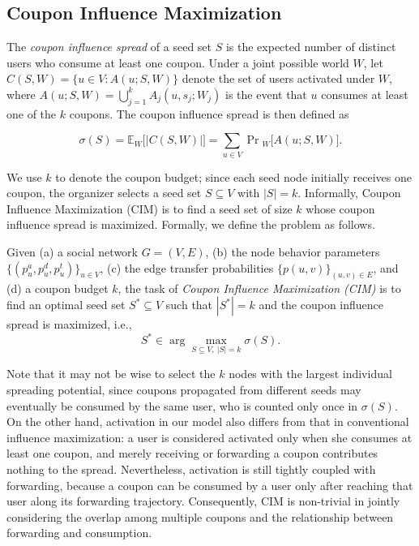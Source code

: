 \documentclass[sigconf]{acmart}
\begin{document}
\subsection{Coupon Influence Maximization}

The \emph{coupon influence spread} of a seed set $S$ is the expected
number of distinct users who consume at least one coupon.
Under a joint possible world $W$, let $C(S,W)=\{u\in V : A(u;S,W)\}$
denote the set of users activated under $W$, where
$A(u;S,W)=\bigcup_{j=1}^{k} A_j(u,s_j;W_j)$ is the event that $u$
consumes at least one of the $k$ coupons.
The coupon influence spread is then defined as

\begin{equation}
\label{eq:coupon-spread}
\sigma(S)
=
\mathbb{E}_{W}\bigl[|C(S,W)|\bigr]
=
\sum_{u\in V}
\Pr{}_{W}\bigl[A(u;S,W)\bigr].
\end{equation}

We use $k$ to denote the coupon budget; since each seed node
initially receives one coupon, the organizer selects a seed set
$S\subseteq V$ with $|S|=k$.
Informally, Coupon Influence Maximization (CIM) is to find a seed set
of size $k$ whose coupon influence spread is maximized.
Formally, we define the problem as follows.

\begin{definition}
\label{def:cim}
Given (a) a social network $G=(V,E)$,
(b) the node behavior parameters
$\{(p_u^a,p_u^d,p_u^t)\}_{u\in V}$,
(c) the edge transfer probabilities
$\{p(u,v)\}_{(u,v)\in E}$,
and (d) a coupon budget $k$,
the task of \emph{Coupon Influence Maximization (CIM)} is to find an
optimal seed set $S^*\subseteq V$ such that $|S^*|=k$ and the coupon
influence spread is maximized, i.e.,
\begin{equation}
\label{eq:cim}
S^*
\in
\arg\max_{S\subseteq V,\ |S|=k}
\sigma(S).
\end{equation}
\end{definition}

Note that it may not be wise to select the $k$ nodes with the largest
individual spreading potential, since coupons propagated from
different seeds may eventually be consumed by the same user, who is
counted only once in $\sigma(S)$.
On the other hand, activation in our model also differs from that in
conventional influence maximization: a user is considered activated
only when she consumes at least one coupon, and merely receiving or
forwarding a coupon contributes nothing to the spread.
Nevertheless, activation is still tightly coupled with forwarding,
because a coupon can be consumed by a user only after reaching that
user along its forwarding trajectory.
Consequently, CIM is non-trivial in jointly considering the overlap
among multiple coupons and the relationship between forwarding and
consumption.
\end{document}
